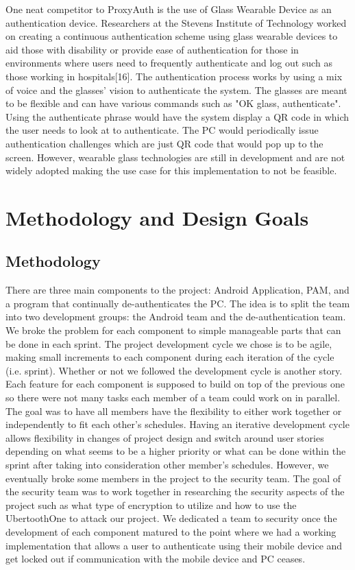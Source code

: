 \documentclass[letterpaper,twocolumn,10pt]{article}
\begin{document}
One neat competitor to ProxyAuth is the use of Glass Wearable Device as an authentication device. Researchers at the Stevens Institute of Technology worked on creating a continuous authentication scheme using glass wearable devices to aid those with disability or provide ease of authentication for those in environments where users need to frequently authenticate and log out such as those working in hospitals[16]. The authentication process works by using a mix of voice and the glasses' vision to authenticate the system. The glasses are meant to be flexible and can have various commands such as "OK glass, authenticate". Using the authenticate phrase would have the system display a QR code in which the user needs to look at to authenticate. The PC would periodically issue authentication challenges which are just QR code that would pop up to the screen. However, wearable glass technologies are still in development and are not widely adopted making the use case for this implementation to not be feasible.

\label{Related Works}


\section{Methodology and Design Goals}
\subsection{Methodology}
There are three main components to the project: Android Application, PAM, and a program that continually de-authenticates the PC. The idea is to split the team into two development groups: the Android team and the de-authentication team. We broke the problem for each component to simple manageable parts that can be done in each sprint. The project development cycle we chose is to be agile, making small increments to each component during each iteration of the cycle (i.e. sprint). Whether or not we followed the development cycle is another story. Each feature for each component is supposed to build on top of the previous one so there were not many tasks each member of a team could work on in parallel. The goal was to have all members have the flexibility to either work together or independently to fit each other's schedules. Having an iterative development cycle allows flexibility in changes of project design and switch around user stories depending on what seems to be a higher priority or what can be done within the sprint after taking into consideration other member's schedules. However, we eventually broke some members in the project to the security team. The goal of the security team was to work together in researching the security aspects of the project such as what type of encryption to utilize and how to use the UbertoothOne to attack our project. We dedicated a team to security once the development of each component matured to the point where we had a working implementation that allows a user to authenticate using their mobile device and get locked out if communication with the mobile device and PC ceases.
\end{document}
